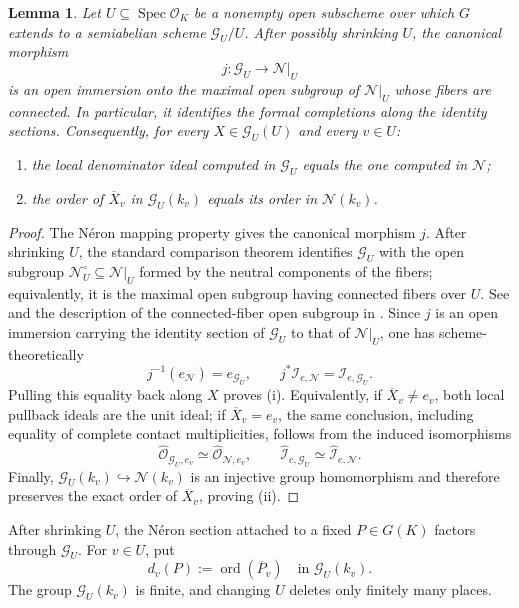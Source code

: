\documentclass[11pt,letterpaper,reqno]{amsart}
\newtheorem{lemma}[theorem]{Lemma}
\theoremstyle{definition}
\theoremstyle{remark}
\newcommand{\OK}{\mathcal O_K}
\newcommand{\ord}{\operatorname{ord}}
\newcommand{\Spec}{\operatorname{Spec}}
\newcommand{\Ner}{\mathcal N}
\begin{document}
\begin{lemma}
\label{lem:model-comparison}
Let $U\subseteq\Spec\OK$ be a nonempty open subscheme over which $G$ extends
to a semiabelian scheme $\mathcal G_U/U$.  After possibly shrinking $U$, the
canonical morphism
\[
 j:\mathcal G_U\longrightarrow\Ner|_U
\]
is an open immersion onto the maximal open subgroup of $\Ner|_U$ whose fibers
are connected.  In particular, it identifies the formal completions along the
identity sections.  Consequently, for every $X\in\mathcal G_U(U)$ and every
$v\in U$:
\begin{enumerate}[label=\textup{(\roman*)}]
\item the local denominator ideal computed in $\mathcal G_U$ equals the one
      computed in $\Ner$;
\item the order of $\overline X_v$ in $\mathcal G_U(k_v)$ equals its order in
      $\Ner(k_v)$.
\end{enumerate}
\end{lemma}

\begin{proof}
The N\'eron mapping property gives the canonical morphism $j$.  After shrinking
$U$, the standard comparison theorem identifies $\mathcal G_U$ with the open
subgroup $\Ner_U^\circ\subseteq\Ner|_U$ formed by the neutral components of
the fibers; equivalently, it is the maximal open subgroup having connected
fibers over $U$.  See \cite[10.1/7 and 10.1/9]{BLR1990} and the description of
the connected-fiber open subgroup in \cite[\S2, p.~6]{Suzuki2019}.
Since $j$ is an open immersion carrying the identity section of $\mathcal G_U$
to that of $\Ner|_U$, one has scheme-theoretically
\[
 j^{-1}(e_{\Ner})=e_{\mathcal G_U},
 \qquad
 j^*\mathcal I_{e,\Ner}=\mathcal I_{e,\mathcal G_U}.
\]
Pulling this equality back along $X$ proves (i).  Equivalently, if
$\overline X_v\ne e_v$, both local pullback ideals are the unit ideal; if
$\overline X_v=e_v$, the same conclusion, including equality of complete
contact multiplicities, follows from the induced isomorphisms
\[
 \widehat{\mathcal O}_{\mathcal G_U,e_v}
 \simeq\widehat{\mathcal O}_{\Ner,e_v},
 \qquad
 \widehat{\mathcal I}_{e,\mathcal G_U}
 \simeq\widehat{\mathcal I}_{e,\Ner}.
\]
Finally, $\mathcal G_U(k_v)\hookrightarrow\Ner(k_v)$ is an injective group
homomorphism and therefore preserves the exact order of $\overline X_v$,
proving (ii).
\end{proof}

After shrinking $U$, the N\'eron section attached to a fixed $P\in G(K)$
factors through $\mathcal G_U$.  For $v\in U$, put
\[
 d_v(P):=\ord(\overline P_v)
 \quad\text{in }\mathcal G_U(k_v).
\]
The group $\mathcal G_U(k_v)$ is finite, and changing $U$ deletes only
finitely many places.
\end{document}
